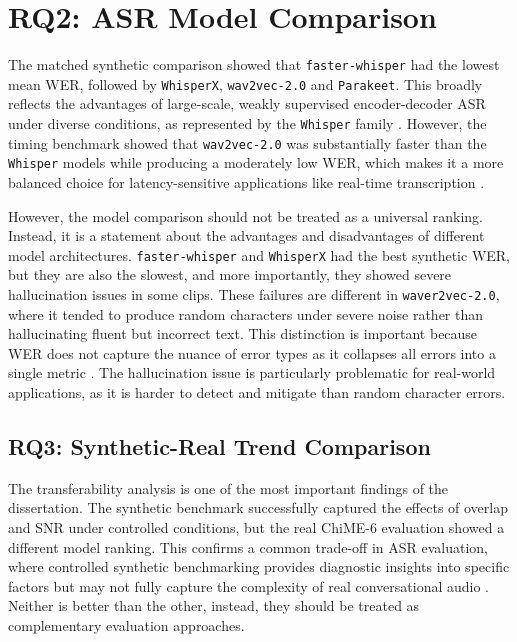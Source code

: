\section{RQ2: ASR Model Comparison}
\label{sec:rq2_discussion}
The matched synthetic comparison showed that \texttt{faster-whisper} had the lowest mean WER, followed by \texttt{WhisperX}, \texttt{wav2vec-2.0} and \texttt{Parakeet}. This broadly reflects the advantages of large-scale, weakly supervised encoder-decoder ASR under diverse conditions, as represented by the \texttt{Whisper} family \citep{radford2022robustspeechrecognitionlargescale, github_openai_faster-whisper, bain2026whisperx_repo}. However, the timing benchmark showed that \texttt{wav2vec-2.0} was substantially faster than the \texttt{Whisper} models while producing a moderately low WER, which makes it a more balanced choice for latency-sensitive applications like real-time transcription \citep{baevski2020wav2vec20frameworkselfsupervised, facebook_wav2vec2-large-960h}.

However, the model comparison should not be treated as a universal ranking. Instead, it is a statement about the advantages and disadvantages of different model architectures. \texttt{faster-whisper} and \texttt{WhisperX} had the best synthetic WER, but they are also the slowest, and more importantly, they showed severe hallucination issues in some clips. These failures are different in \texttt{waver2vec-2.0}, where it tended to produce random characters under severe noise rather than hallucinating fluent but incorrect text. This distinction is important because WER does not capture the nuance of error types as it collapses all errors into a single metric \citep{morris04_interspeech, sasindran2023hevalnewhybridevaluation, ellis2026werunawareassessingasr, hughes2025problemwithwer}. The hallucination issue is particularly problematic for real-world applications, as it is harder to detect and mitigate than random character errors.

\subsection{RQ3: Synthetic-Real Trend Comparison}
The transferability analysis is one of the most important findings of the dissertation. The synthetic benchmark successfully captured the effects of overlap and SNR under controlled conditions, but the real ChiME-6 evaluation showed a different model ranking. This confirms a common trade-off in ASR evaluation, where controlled synthetic benchmarking provides diagnostic insights into specific factors but may not fully capture the complexity of real conversational audio \citep{ami-corpus, carletta2005ami, chime6, watanabe2020chime6challengetacklingmultispeakerspeech}. Neither is better than the other, instead, they should be treated as complementary evaluation approaches.

